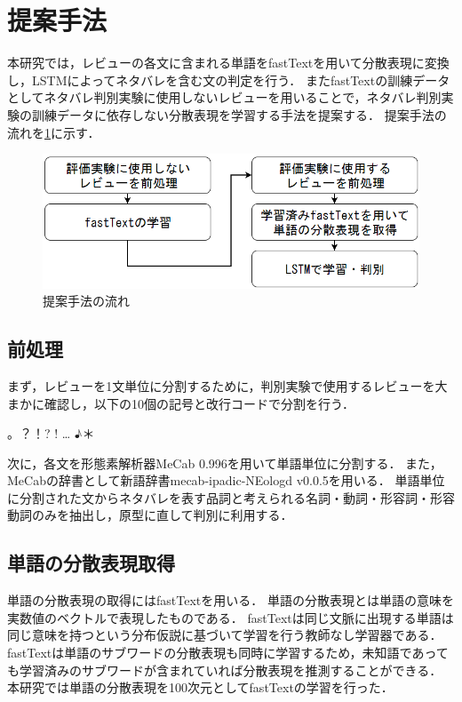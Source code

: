\documentclass[autodetect-engine,dvipdfmx-if-dvi,ja=standard,a4j,jbase=10.5pt,twoside,twocolumn,magstyle=nomag*]{bxjsarticle}
\begin{document}
\section{提案手法}
本研究では，レビューの各文に含まれる単語をfastText\cite{fasttext}を用いて分散表現に変換し，LSTMによってネタバレを含む文の判定を行う．
またfastTextの訓練データとしてネタバレ判別実験に使用しないレビューを用いることで，ネタバレ判別実験の訓練データに依存しない分散表現を学習する手法を提案する．
提案手法の流れを\cref{fig:pmf}に示す．

\begin{figure}[t]
  \centering
  \includegraphics[width=1.0\linewidth, clip]{./figure/proposed_method_flow.png}
  \caption{提案手法の流れ}
  \label{fig:pmf}
\end{figure}

\subsection{前処理} \label{subsec:preprocessing}
まず，レビューを1文単位に分割するために，判別実験で使用するレビューを大まかに確認し，以下の10個の記号と改行コードで分割を行う．
\begin{center}
。？！? ! … ♪＊
\end{center}

次に，各文を形態素解析器MeCab 0.996を用いて単語単位に分割する．
また，MeCabの辞書として新語辞書mecab-ipadic-NEologd v0.0.5を用いる．
単語単位に分割された文からネタバレを表す品詞と考えられる名詞・動詞・形容詞・形容動詞のみを抽出し，原型に直して判別に利用する．

\subsection{単語の分散表現取得}
単語の分散表現の取得にはfastTextを用いる．
単語の分散表現とは単語の意味を実数値のベクトルで表現したものである．
fastTextは同じ文脈に出現する単語は同じ意味を持つという分布仮説に基づいて学習を行う教師なし学習器である．
fastTextは単語のサブワードの分散表現も同時に学習するため，未知語であっても学習済みのサブワードが含まれていれば分散表現を推測することができる．
本研究では単語の分散表現を100次元としてfastTextの学習を行った．
\end{document}
